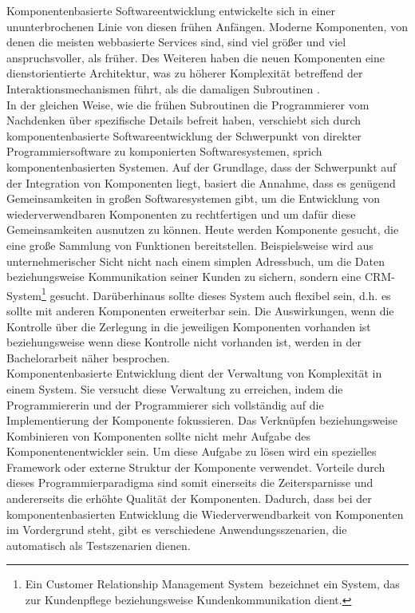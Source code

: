 Komponentenbasierte Softwareentwicklung entwickelte sich in einer ununterbrochenen Linie von diesen frühen Anfängen. Moderne Komponenten, von denen die meisten webbasierte Services sind, sind viel größer und viel anspruchsvoller, als früher. Des Weiteren haben die neuen Komponenten eine dienstorientierte Architektur, was zu höherer Komplexität betreffend der Interaktionsmechanismen führt, als die damaligen Subroutinen \autocite{Andresen.2003}. \\
In der gleichen Weise, wie die frühen Subroutinen die Programmierer vom Nachdenken über spezifische Details befreit haben, verschiebt sich durch komponentenbasierte Softwareentwicklung der Schwerpunkt von direkter Programmiersoftware zu komponierten Softwaresystemen, sprich komponentenbasierten Systemen. Auf der Grundlage, dass der Schwerpunkt auf der Integration von Komponenten liegt, basiert die Annahme, dass es genügend Gemeinsamkeiten in  großen Softwaresystemen gibt, um die Entwicklung von wiederverwendbaren Komponenten zu rechtfertigen und um dafür diese Gemeinsamkeiten ausnutzen zu können. Heute werden Komponente gesucht, die eine große Sammlung von Funktionen bereitstellen. Beispielsweise wird aus unternehmerischer Sicht nicht nach einem simplen Adressbuch, um die Daten beziehungsweise Kommunikation seiner Kunden zu sichern, sondern eine CRM-System\footnote{Ein \glqq Customer Relationship Management System\grqq\ bezeichnet ein System, das zur Kundenpflege beziehungsweise Kundenkommunikation dient.} gesucht. Darüberhinaus sollte dieses System auch flexibel sein, d.h. es sollte mit anderen Komponenten erweiterbar sein. Die Auswirkungen, wenn die Kontrolle über die Zerlegung in die jeweiligen Komponenten vorhanden ist beziehungsweise wenn diese Kontrolle nicht vorhanden ist, werden in der Bachelorarbeit näher besprochen\citereset \autocite{Andresen.2003}. \\
Komponentenbasierte Entwicklung dient der Verwaltung von Komplexität in einem System. Sie versucht diese Verwaltung zu erreichen, indem die Programmiererin und der Programmierer sich vollständig auf die Implementierung der Komponente fokussieren. Das Verknüpfen beziehungsweise Kombinieren von Komponenten sollte nicht mehr Aufgabe des Komponentenentwickler sein. Um diese Aufgabe zu lösen wird ein spezielles Framework oder externe Struktur der Komponente verwendet. Vorteile durch dieses Programmierparadigma sind somit einerseits die Zeitersparnisse und andererseits die erhöhte Qualität der Komponenten. Dadurch, dass bei der komponentenbasierten Entwicklung die Wiederverwendbarkeit von Komponenten im Vordergrund steht, gibt es verschiedene Anwendungsszenarien, die automatisch als Testszenarien dienen\citereset \autocite{Andresen.2003}.\\
